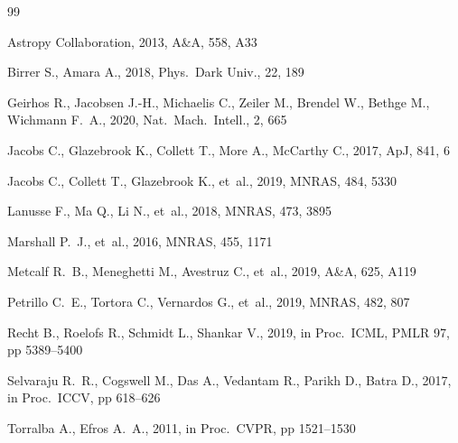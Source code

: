 \documentclass[fleqn,usenatbib]{mnras}
\begin{document}
\begin{thebibliography}{99}

Astropy Collaboration, 2013, A\&A, 558, A33

Birrer S., Amara A., 2018, Phys.\ Dark Univ., 22, 189

Geirhos R., Jacobsen J.-H., Michaelis C., Zeiler M., Brendel W.,
Bethge M., Wichmann F.~A., 2020, Nat.\ Mach.\ Intell., 2, 665

Jacobs C., Glazebrook K., Collett T., More A., McCarthy C., 2017, ApJ,
841, 6

Jacobs C., Collett T., Glazebrook K., et~al., 2019, MNRAS, 484, 5330

Lanusse F., Ma Q., Li N., et~al., 2018, MNRAS, 473, 3895

Marshall P.~J., et~al., 2016, MNRAS, 455, 1171

Metcalf R.~B., Meneghetti M., Avestruz C., et~al., 2019, A\&A, 625,
A119

Petrillo C.~E., Tortora C., Vernardos G., et~al., 2019, MNRAS, 482,
807

Recht B., Roelofs R., Schmidt L., Shankar V., 2019, in Proc.\ ICML,
PMLR 97, pp 5389--5400

Selvaraju R.~R., Cogswell M., Das A., Vedantam R., Parikh D., Batra D.,
2017, in Proc.\ ICCV, pp 618--626

Torralba A., Efros A.~A., 2011, in Proc.\ CVPR, pp 1521--1530

\end{thebibliography}

\label{lastpage}
\end{document}
